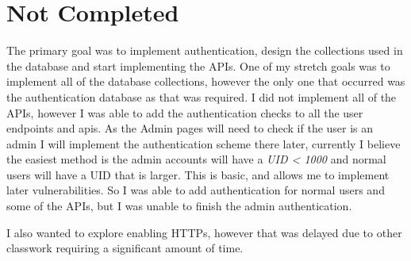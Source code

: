 \documentclass{article}
\begin{document}
\section{Not Completed}
The primary goal was to implement authentication, design the collections used in the database and start implementing the APIs. One of my stretch goals
was to implement all of the database collections, however the only one that occurred was the authentication database as that was required. I did not
implement all of the APIs, however I was able to add the authentication checks to all the user endpoints and apis. As the Admin pages will need to
check if the user is an admin I will implement the authentication scheme there later, currently I believe the easiest method is the admin accounts will
have a \textit{UID < 1000} and normal users will have a UID that is larger. This is basic, and allows me to implement later vulnerabilities. So I was
able to add authentication for normal users and some of the APIs, but I was unable to finish the admin authentication.

I also wanted to explore enabling HTTPs, however that was delayed due to other classwork requiring a significant amount of time.
\end{document}
